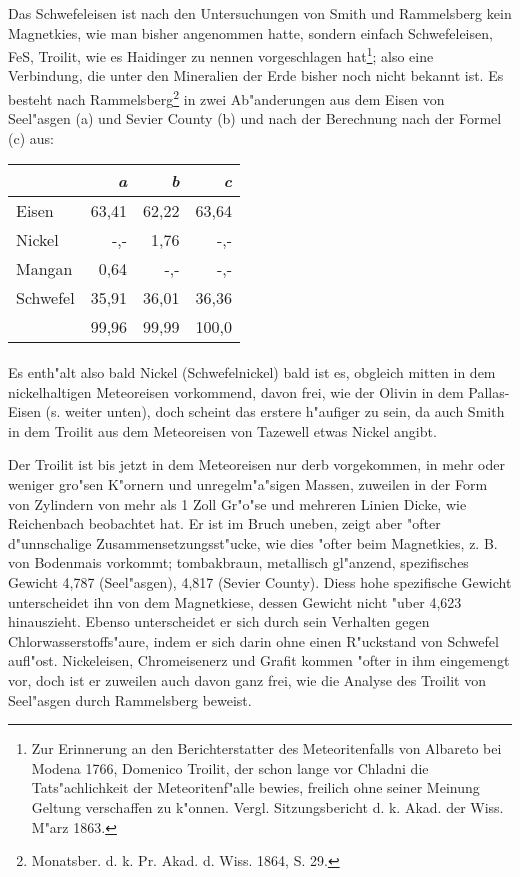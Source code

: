 \documentclass[a4paper, 11pt, oneside, german]{article}
\begin{document}
Das Schwefeleisen ist nach den Untersuchungen von Smith und Rammelsberg kein Magnetkies, wie man bisher angenommen hatte, sondern einfach Schwefeleisen, FeS, Troilit, wie es Haidinger zu nennen vorgeschlagen hat\footnote{Zur Erinnerung an den Berichterstatter des Meteoritenfalls von Albareto bei Modena 1766, Domenico Troilit, der schon lange vor Chladni die Tats"achlichkeit der Meteoritenf"alle bewies, freilich ohne seiner Meinung Geltung verschaffen zu k"onnen. Vergl. Sitzungsbericht d. k. Akad. der Wiss. M"arz 1863.}; also eine Verbindung, die unter den Mineralien der Erde bisher noch nicht bekannt ist. Es besteht nach Rammelsberg\footnote{Monatsber. d. k. Pr. Akad. d. Wiss. 1864, S. 29.} in zwei Ab"anderungen aus dem Eisen von Seel"asgen (a) und Sevier County (b) und nach der Berechnung nach der Formel (c) aus:
\begin{center}
\begin{tabular}{ |l|r|r|r| }
    \hline
     & \emph{a} & \emph{b} & \emph{c}\\
    \hline\hline
    Eisen & 63,41 & 62,22 & 63,64\\\hline
    Nickel & -,- & 1,76 & -,-\\\hline
    Mangan & 0,64 & -,- & -,-\\\hline
    Schwefel & 35,91 & 36,01 & 36,36\\\hline
     & 99,96 & 99,99 & 100,0\\
    \hline
\end{tabular}
\end{center}
\paragraph{}
Es enth"alt also bald Nickel (Schwefelnickel) bald ist es, obgleich mitten in dem nickelhaltigen Meteoreisen vorkommend, davon frei, wie der Olivin in dem Pallas-Eisen (s. weiter unten), doch scheint das erstere h"aufiger zu sein, da auch Smith in dem Troilit aus dem Meteoreisen von Tazewell etwas Nickel angibt. 

Der Troilit ist bis jetzt in dem Meteoreisen nur derb vorgekommen, in mehr oder weniger gro"sen K"ornern und unregelm"a"sigen Massen, zuweilen in der Form von Zylindern von mehr als 1 Zoll Gr"o"se und mehreren Linien Dicke, wie Reichenbach beobachtet hat. Er ist im Bruch uneben, zeigt aber "ofter d"unnschalige Zusammensetzungsst"ucke, wie dies "ofter beim Magnetkies, z. B. von Bodenmais vorkommt; tombakbraun, metallisch gl"anzend, spezifisches Gewicht 4,787 (Seel"asgen), 4,817 (Sevier County). Diess hohe spezifische Gewicht unterscheidet ihn von dem Magnetkiese, dessen Gewicht nicht "uber 4,623 hinauszieht. Ebenso unterscheidet er sich durch sein Verhalten gegen Chlorwasserstoffs"aure, indem er sich darin ohne einen R"uckstand von Schwefel aufl"ost. Nickeleisen, Chromeisenerz und Grafit kommen "ofter in ihm eingemengt vor, doch ist er zuweilen auch davon ganz frei, wie die Analyse des Troilit von Seel"asgen durch Rammelsberg beweist.
\end{document}
